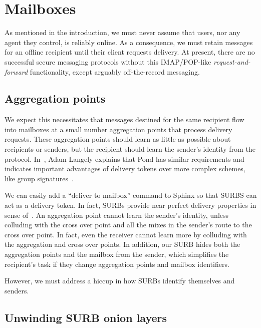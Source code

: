 
\section{Mailboxes}

As mentioned in the introduction, we must never assume that users,
nor any agent they control, is reliably online.  
As a consequence, we must retain messages for an offline recipient
until their client requests delivery.  
At present, there are no successful secure messaging protocols
without this IMAP/POP-like {\em request-and-forward} functionality,
except arguably off-the-record messaging. 


\subsection{Aggregation points}

We expect this necessitates that messages destined for the same
recipient flow into mailboxes at a small number aggregation points
that process delivery requests.  These aggregation points should
learn as little as possible about recipients or senders, but the
recipient should learn the sender's identity from the protocol.
In~\cite{agl-pond-hmac}, Adam Langely explains that Pond has similar
requirements and indicates important advantages of delivery tokens
over more complex schemes, like group signatures~\cite{VLR,BBS}.

We can easily add a ``deliver to mailbox'' command to Sphinx so that
SURBS can act as a delivery token.  In fact, SURBs provide near
perfect delivery properties in sense of~\cite{warner-delivery}.
An aggregation point cannot learn the sender's identity, unless
colluding with the cross over point and all the mixes in the 
sender's route to the cross over point.  
In fact, even the receiver cannot learn more by colluding with
the aggregation and cross over points.  In addition, our SURB
hides both the aggregation points and the mailbox from the sender,
which simplifies the recipient's task if they change aggregation
points and mailbox identifiers.

However, we must address a hiccup in how SURBs identify themselves
and senders.

\subsection{Unwinding SURB onion layers}

